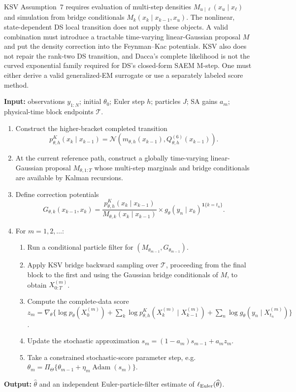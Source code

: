 \documentclass[11pt]{article}
\newcommand{\N}{\mathcal N}
\begin{document}
KSV Assumption~7 requires evaluation of multi-step densities
$M_{u\mid\ell}(x_u\mid x_\ell)$ and simulation from bridge conditionals
$M_k(x_k\mid x_{k-1},x_u)$.  The nonlinear, state-dependent DS local transition
does not supply these objects.  A valid combination must introduce a tractable
time-varying linear-Gaussian proposal $M$ and put the density correction into
the Feynman--Kac potentials.  KSV also does not repair the rank-two DS
transition, and Dacca's complete likelihood is not the curved exponential
family required for DS's closed-form SAEM M-step.  One must either derive a
valid generalized-EM surrogate or use a separately labeled score method.

\begin{algorithm}[ht]
\caption{Full DS--Krylov--KSV stochastic-approximation score ascent
(design, not the executed baseline)}
\label{alg:combined}
\textbf{Input:} observations $y_{1:N}$; initial $\theta_0$; Euler step $h$;
particles $J$; SA gains $a_m$; physical-time block endpoints $\mathcal T$.
\begin{enumerate}
\item Construct the higher-bracket completed transition
\[
p^{K}_{\theta,h}(x_k\mid x_{k-1})=
\N\!\left(m_{\theta,h}(x_{k-1}),Q^{(6)}_{\theta,h}(x_{k-1})\right).
\]
\item At the current reference path, construct a globally time-varying
linear-Gaussian proposal $M_{\theta,1:T}$ whose multi-step marginals and bridge
conditionals are available by Kalman recursions.
\item Define correction potentials
\[
 G_{\theta,k}(x_{k-1},x_k)=
 \frac{p^{K}_{\theta,h}(x_k\mid x_{k-1})}
      {M_{\theta,k}(x_k\mid x_{k-1})}
 \times g_\theta(y_n\mid x_k)^{\mathbf 1\{k=t_n\}}.
\]
\item For $m=1,2,\ldots$:
  \begin{enumerate}
  \item Run a conditional particle filter for
  $(M_{\theta_{m-1}},G_{\theta_{m-1}})$.
  \item Apply KSV bridge backward sampling over $\mathcal T$, proceeding from
  the final block to the first and using the Gaussian bridge conditionals of
  $M$, to obtain $X^{(m)}_{0:T}$.
  \item Compute the complete-data score
  $z_m=\nabla_\theta\{\log p_\theta(X^{(m)}_0)+
  \sum_k\log p^K_{\theta,h}(X^{(m)}_k\mid X^{(m)}_{k-1})+
  \sum_n\log g_\theta(y_n\mid X^{(m)}_{t_n})\}$.
  \item Update the stochastic approximation
  $s_m=(1-a_m)s_{m-1}+a_mz_m$.
  \item Take a constrained stochastic-score parameter step, e.g.
  $\theta_m=\Pi_\Theta\{\theta_{m-1}+\eta_m\operatorname{Adam}(s_m)\}$.
  \end{enumerate}
\end{enumerate}
\textbf{Output:} $\widehat\theta$ and an independent Euler-particle-filter
estimate of $\ell_{\rm Euler}(\widehat\theta)$.
\end{algorithm}
\end{document}

